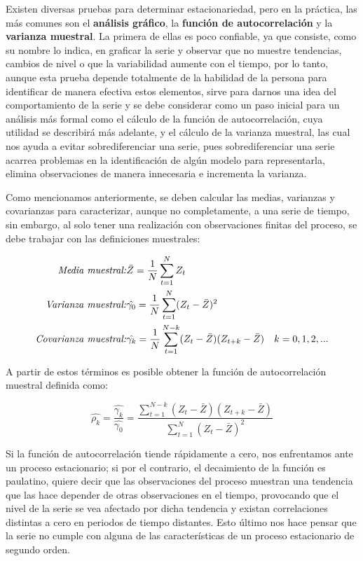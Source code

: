 Existen diversas pruebas para determinar estacionariedad, pero en la práctica, las más comunes son el \textbf{análisis gráfico}, la \textbf{función de autocorrelación} y la \textbf{varianza muestral}. La primera de ellas es poco confiable, ya que consiste, como su nombre lo indica, en graficar la serie y observar que no muestre tendencias, cambios de nivel o que la variabilidad aumente con el tiempo, por lo tanto, aunque esta prueba depende totalmente de la habilidad de la persona para identificar de manera efectiva estos elementos, sirve para darnos una idea del comportamiento de la serie y se debe considerar como un paso inicial para un análisis más formal como el cálculo de la función de autocorrelación, cuya utilidad se describirá más adelante, y el cálculo de la varianza muestral, las cual nos ayuda a evitar sobrediferenciar una serie, pues sobrediferenciar una serie acarrea problemas en la identificación de algún modelo para representarla, elimina observaciones de manera innecesaria e incrementa la varianza.\newline

Como mencionamos anteriormente, se deben calcular las medias, varianzas y covarianzas para caracterizar, aunque no completamente, a una serie de tiempo, sin embargo, al solo tener una realización con observaciones finitas del proceso, se debe trabajar con las definiciones muestrales:\newline


\begin{eqnarray}
        \mbox{\emph{Media muestral:}} & \bar{Z} =\frac{1}{N} \sum_{t=1}^{N}{Z_t} &  \nonumber \\ 
        \mbox{\emph{Varianza muestral:}}  & \hat{\gamma_0}=\frac{1}{N} \sum_{t=1}^{N}(Z_t- \bar{Z} )^2 & \\ 
        \mbox{\emph{Covarianza muestral:}} & \hat{\gamma_k}=\frac{1}{N} \sum_{t=1}^{N-k}(Z_t-\bar{Z})(Z_{t+k}-\bar{Z})  & k=0,1,2,...  \nonumber
\end{eqnarray} 

A partir de estos términos es posible obtener la función de autocorrelación muestral definida como:

\begin{equation}
\hat{\rho_k}= \frac{\hat{\gamma_k}}{\hat{\gamma_0}}=\frac{\sum_{t=1}^{N-k}(Z_t-\bar{Z})(Z_{t+k}-\bar{Z})}{\sum_{t=1}^{N}(Z_t- \bar{Z} )^2}
\end{equation}




Si la función de autocorrelación tiende rápidamente a cero, nos enfrentamos ante un proceso estacionario; si por el contrario, el decaimiento de la función es paulatino, quiere decir que las observaciones del proceso muestran una tendencia que las hace depender de  otras observaciones en el tiempo, provocando que el nivel de la serie se vea afectado por dicha tendencia y existan correlaciones distintas a cero en periodos de tiempo distantes. Esto último nos hace pensar que la serie no cumple con alguna de las características de un proceso estacionario de segundo orden. \\


